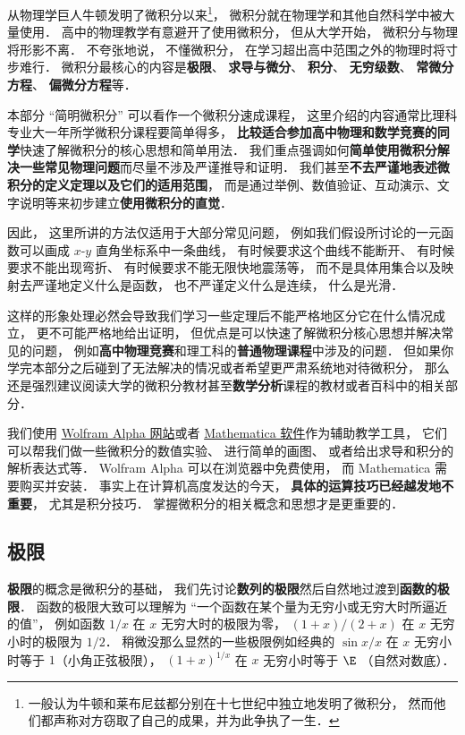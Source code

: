 
从物理学巨人牛顿发明了微积分以来\footnote{一般认为牛顿和莱布尼兹都分别在十七世纪中独立地发明了微积分， 然而他们都声称对方窃取了自己的成果，并为此争执了一生．}， 微积分就在物理学和其他自然科学中被大量使用． 高中的物理教学有意避开了使用微积分， 但从大学开始， 微积分与物理将形影不离． 不夸张地说， 不懂微积分， 在学习超出高中范围之外的物理时将寸步难行． 微积分最核心的内容是\textbf{极限}、 \textbf{求导与微分}、 \textbf{积分}、 \textbf{无穷级数}、 \textbf{常微分方程}、 \textbf{偏微分方程}等．

本部分 “简明微积分” 可以看作一个微积分速成课程， 这里介绍的内容通常比理科专业大一年所学微积分课程要简单得多， \textbf{比较适合参加高中物理和数学竞赛的同学}快速了解微积分的核心思想和简单用法． 我们重点强调如何\textbf{简单使用微积分解决一些常见物理问题}而尽量不涉及严谨推导和证明． 我们甚至\textbf{不去严谨地表述微积分的定义定理以及它们的适用范围}， 而是通过举例、数值验证、互动演示、文字说明等来初步建立\textbf{使用微积分的直觉}．

因此， 这里所讲的方法仅适用于大部分常见问题， 例如我们假设所讨论的一元函数可以画成 $x$-$y$ 直角坐标系中一条曲线， 有时候要求这个曲线不能断开、 有时候要求不能出现弯折、 有时候要求不能无限快地震荡等， 而不是具体用集合以及映射去严谨地定义什么是函数， 也不严谨定义什么是连续， 什么是光滑．

这样的形象处理必然会导致我们学习一些定理后不能严格地区分它在什么情况成立， 更不可能严格地给出证明， 但优点是可以快速了解微积分核心思想并解决常见的问题， 例如\textbf{高中物理竞赛}和理工科的\textbf{普通物理课程}中涉及的问题． 但如果你学完本部分之后碰到了无法解决的情况或者希望更严肃系统地对待微积分， 那么还是强烈建议阅读大学的微积分教材甚至\textbf{数学分析}课程的教材或者百科中的相关部分．

我们使用 \href{https://www.wolframalpha.com/}{Wolfram Alpha 网站}或者 \href{https://www.wolfram.com/mathematica/}{Mathematica 软件}作为辅助教学工具， 它们可以帮我们做一些微积分的数值实验、 进行简单的画图、 或者给出求导和积分的解析表达式等． Wolfram Alpha 可以在浏览器中免费使用， 而 Mathematica 需要购买并安装． 事实上在计算机高度发达的今天， \textbf{具体的运算技巧已经越发地不重要}， 尤其是积分技巧． 掌握微积分的相关概念和思想才是更重要的．

\subsection{极限}
\textbf{极限}的概念是微积分的基础， 我们先讨论\textbf{数列的极限}然后自然地过渡到\textbf{函数的极限}． 函数的极限大致可以理解为 “一个函数在某个量为无穷小或无穷大时所逼近的值”， 例如函数 $1/x$ 在 $x$ 无穷大时的极限为零， $(1+x)/(2+x)$ 在 $x$ 无穷小时的极限为 $1/2$． 稍微没那么显然的一些极限例如经典的 $\sin x/ x$ 在 $x$ 无穷小时等于 $1$（小角正弦极限）， $(1+x)^{1/x}$ 在 $x$ 无穷小时等于 $\E$ （自然对数底）．

